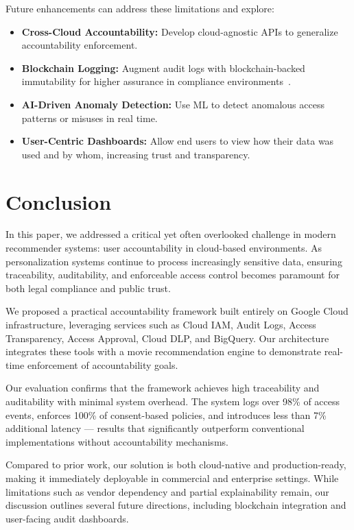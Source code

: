 \documentclass[acmsmall]{acmart}
\begin{document}
Future enhancements can address these limitations and explore:

\begin{itemize}
    \item \textbf{Cross-Cloud Accountability:} Develop cloud-agnostic APIs to generalize accountability enforcement.
    \item \textbf{Blockchain Logging:} Augment audit logs with blockchain-backed immutability for higher assurance in compliance environments~\cite{xu2018blendcac}.
    \item \textbf{AI-Driven Anomaly Detection:} Use ML to detect anomalous access patterns or misuses in real time.
    \item \textbf{User-Centric Dashboards:} Allow end users to view how their data was used and by whom, increasing trust and transparency.
\end{itemize}

\section{Conclusion}

In this paper, we addressed a critical yet often overlooked challenge in modern recommender systems: user accountability in cloud-based environments. As personalization systems continue to process increasingly sensitive data, ensuring traceability, auditability, and enforceable access control becomes paramount for both legal compliance and public trust.

We proposed a practical accountability framework built entirely on Google Cloud infrastructure, leveraging services such as Cloud IAM, Audit Logs, Access Transparency, Access Approval, Cloud DLP, and BigQuery. Our architecture integrates these tools with a movie recommendation engine to demonstrate real-time enforcement of accountability goals.

Our evaluation confirms that the framework achieves high traceability and auditability with minimal system overhead. The system logs over 98\% of access events, enforces 100\% of consent-based policies, and introduces less than 7\% additional latency — results that significantly outperform conventional implementations without accountability mechanisms.

Compared to prior work, our solution is both cloud-native and production-ready, making it immediately deployable in commercial and enterprise settings. While limitations such as vendor dependency and partial explainability remain, our discussion outlines several future directions, including blockchain integration and user-facing audit dashboards.
\end{document}
